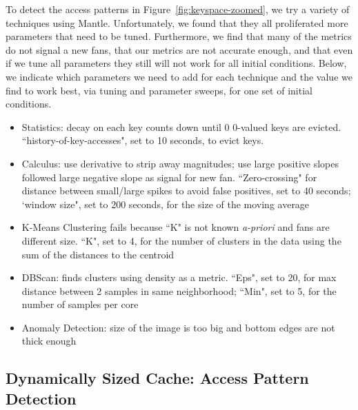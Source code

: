To detect the access patterns in Figure~\ref{fig:keyspace-zoomed}, we try a
variety of techniques using Mantle. Unfortunately, we found that they all
proliferated more parameters that need to be tuned. Furthermore, we find that
many of the metrics do not signal a new fans, that our metrics are not accurate
enough, and that even if we tune all parameters they still will not work for
all initial conditions.  Below, we indicate which parameters we need to add for
each technique and the value we find to work best, via tuning and parameter
sweeps, for one set of initial conditions.

\begin{itemize}

  \item Statistics: decay on each key counts down until 0 0-valued keys are
evicted.  ``history-of-key-accesses", set to 10 seconds, to evict keys.

  \item Calculus: use derivative to strip away magnitudes; use large positive
slopes followed large negative slope as signal for new fan. ``Zero-crossing"
for distance between small/large spikes to avoid false positives, set to 40
seconds; `window size", set to 200 seconds, for the size of the moving average 

  \item K-Means Clustering fails because ``K" is not known {\it a-priori} and
fans are different size. ``K", set to 4, for the number of clusters in the data
using the sum of the distances to the centroid

  \item DBScan: finds clusters using density as a metric. ``Eps", set to 20, for
max distance between 2 samples in same neighborhood; ``Min", set to 5, for the
number of samples per core

  \item Anomaly Detection: size of the image is too big and bottom edges are
not thick enough

\end{itemize}

\subsection{Dynamically Sized Cache: Access Pattern Detection}
\label{sec:regime-detection}

